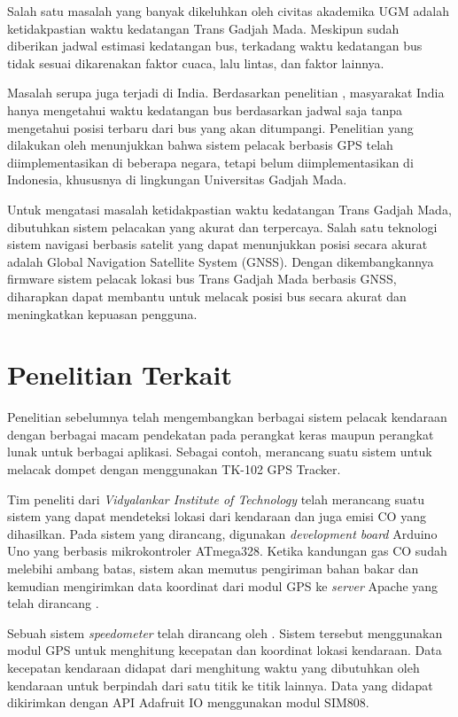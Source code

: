 \documentclass[conference]{IEEEtran}
\begin{document}
Salah satu masalah yang banyak dikeluhkan oleh civitas akademika UGM adalah ketidakpastian waktu kedatangan Trans Gadjah Mada. Meskipun sudah diberikan jadwal estimasi kedatangan bus, terkadang waktu kedatangan bus tidak sesuai dikarenakan faktor cuaca, lalu lintas, dan faktor lainnya.

Masalah serupa juga terjadi di India. Berdasarkan penelitian \cite{Sutar2016}, masyarakat India hanya mengetahui waktu kedatangan bus berdasarkan jadwal saja tanpa mengetahui posisi terbaru dari bus yang akan ditumpangi. Penelitian yang dilakukan oleh \cite{Sneha2014} menunjukkan bahwa sistem pelacak berbasis GPS telah diimplementasikan di beberapa negara, tetapi belum diimplementasikan di Indonesia, khususnya di lingkungan Universitas Gadjah Mada.

Untuk mengatasi masalah ketidakpastian waktu kedatangan Trans Gadjah Mada, dibutuhkan sistem pelacakan yang akurat dan terpercaya. Salah satu teknologi sistem navigasi berbasis satelit yang dapat menunjukkan posisi secara akurat adalah Global Navigation Satellite System (GNSS). Dengan dikembangkannya firmware sistem pelacak lokasi bus Trans Gadjah Mada berbasis GNSS, diharapkan dapat membantu untuk melacak posisi bus secara akurat dan meningkatkan kepuasan pengguna.

\section{Penelitian Terkait}
Penelitian sebelumnya telah mengembangkan berbagai sistem pelacak kendaraan dengan berbagai macam pendekatan pada perangkat keras maupun perangkat lunak untuk berbagai aplikasi. Sebagai contoh, \cite{Ekhsan2022} merancang suatu sistem untuk melacak dompet dengan menggunakan TK-102 GPS Tracker.

Tim peneliti dari \textit{Vidyalankar Institute of Technology} telah merancang suatu sistem yang dapat mendeteksi lokasi dari kendaraan dan juga emisi CO yang dihasilkan. Pada sistem yang dirancang, digunakan \textit{development board} Arduino Uno yang berbasis mikrokontroler ATmega328. Ketika kandungan gas CO sudah melebihi ambang batas, sistem akan memutus pengiriman bahan bakar dan kemudian mengirimkan data koordinat dari modul GPS ke \textit{server} Apache yang telah dirancang \cite{Asha2022}.

Sebuah sistem \textit{speedometer} telah dirancang oleh \cite{Najmurrokhman2021}. Sistem tersebut menggunakan modul GPS untuk menghitung kecepatan dan koordinat lokasi kendaraan. Data kecepatan kendaraan didapat dari menghitung waktu yang dibutuhkan oleh kendaraan untuk berpindah dari satu titik ke titik lainnya. Data yang didapat dikirimkan dengan API Adafruit IO menggunakan modul SIM808.
\end{document}
